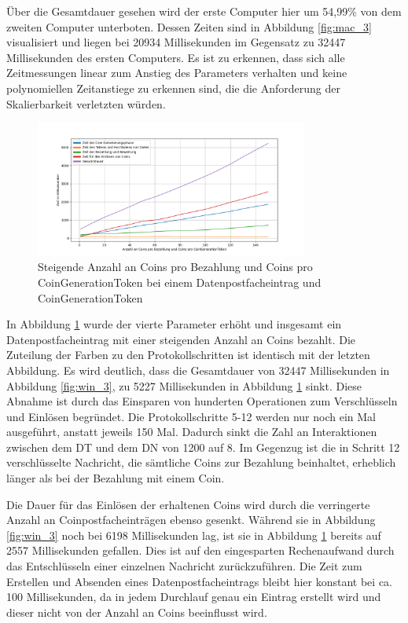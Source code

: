 \documentclass[
	fontsize=11pt,
	headings=small,
	parskip=half,           %
	bibliography=totoc,
	numbers=noenddot,       %
	open=any,               %
]{scrreprt}
\begin{document}
Über die Gesamtdauer gesehen wird der erste Computer hier um 54,99\% von dem zweiten Computer unterboten. Dessen Zeiten sind in Abbildung \ref{fig:mac_3} visualisiert und liegen bei 20934 Millisekunden im Gegensatz zu 32447 Millisekunden des ersten Computers. Es ist zu erkennen, dass sich alle Zeitmessungen linear zum Anstieg des Parameters verhalten und keine polynomiellen Zeitanstiege zu erkennen sind, die die Anforderung der Skalierbarkeit verletzten würden.


\begin{figure}[H]
    \caption{Steigende Anzahl an Coins pro Bezahlung und Coins pro CoinGenerationToken bei einem Datenpostfacheintrag und CoinGenerationToken}
    \label{fig:win_4}
    \centering
    \includegraphics[width=0.8\textwidth]{figure_win_4.png}
\end{figure}
In Abbildung \ref{fig:win_4} wurde der vierte Parameter erhöht und insgesamt ein Datenpostfacheintrag mit einer steigenden Anzahl an Coins bezahlt. Die Zuteilung der Farben zu den Protokollschritten ist identisch mit der letzten Abbildung. Es wird deutlich, dass die Gesamtdauer von 32447 Millisekunden in Abbildung \ref{fig:win_3}, zu 5227 Millisekunden in Abbildung \ref{fig:win_4} sinkt. Diese Abnahme ist durch das Einsparen von hunderten Operationen zum Verschlüsseln und Einlösen begründet. Die Protokollschritte 5-12 werden nur noch ein Mal ausgeführt, anstatt jeweils 150 Mal. Dadurch sinkt die Zahl an Interaktionen zwischen dem DT und dem DN von 1200 auf 8. Im Gegenzug ist die in Schritt 12 verschlüsselte Nachricht, die sämtliche Coins zur Bezahlung beinhaltet, erheblich länger als bei der Bezahlung mit einem Coin.

Die Dauer für das Einlösen der erhaltenen Coins wird durch die verringerte Anzahl an Coinpostfacheinträgen ebenso gesenkt. Während sie in Abbildung \ref{fig:win_3} noch bei 6198 Millisekunden lag, ist sie in Abbildung \ref{fig:win_4} bereits auf 2557 Millisekunden gefallen. Dies ist auf den eingesparten Rechenaufwand durch das Entschlüsseln einer einzelnen Nachricht zurückzuführen. Die Zeit zum Erstellen und Absenden eines Datenpostfacheintrags bleibt hier konstant bei ca. 100 Millisekunden, da in jedem Durchlauf genau ein Eintrag erstellt wird und dieser nicht von der Anzahl an Coins beeinflusst wird.
\end{document}
